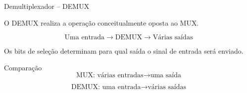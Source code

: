 \begin{frame}{Demultiplexador -- DEMUX}

    O DEMUX realiza a operação conceitualmente oposta ao MUX.

    \[
        \boxed{\text{Uma entrada}}
        \longrightarrow
        \boxed{\text{DEMUX}}
        \longrightarrow
        \boxed{\text{Várias saídas}}
    \]

    \vspace{0.5cm}

    Os bits de seleção determinam para qual saída
    o sinal de entrada será enviado.

    \begin{alertblock}{Comparação}
        \[
            \text{MUX: várias entradas}
            \rightarrow
            \text{uma saída}
        \]

        \[
            \text{DEMUX: uma entrada}
            \rightarrow
            \text{várias saídas}
        \]
    \end{alertblock}

\end{frame}